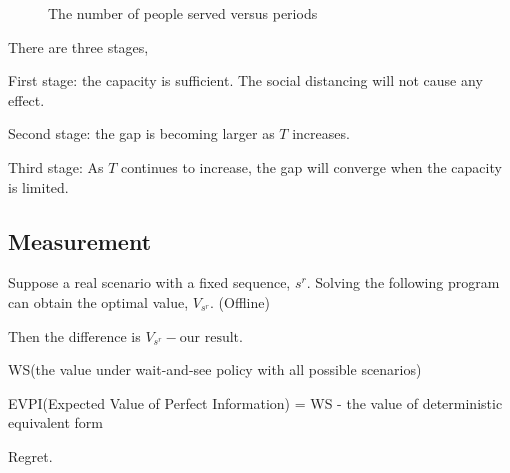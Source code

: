 \begin{figure}[h]
  \centering
  \caption{The number of people served versus periods}
  \label{Fig.lable}
\end{figure}

There are three stages, 

First stage: the capacity is sufficient. The social distancing will not cause any effect.

Second stage: the gap is becoming larger as $T$ increases. 

Third stage: As $T$ continues to increase, the gap will converge when the capacity is limited.


\subsection{Measurement}

Suppose a real scenario with a fixed sequence, $s^{r}$. Solving the following program can obtain the optimal value, $V_{s^{r}}$. (Offline)

Then the difference is $V_{s^{r}} - \text{our result}$.

WS(the value under wait-and-see policy with all possible scenarios)

EVPI(Expected Value of Perfect Information) = WS - the value of deterministic equivalent form

Regret.


\newpage
